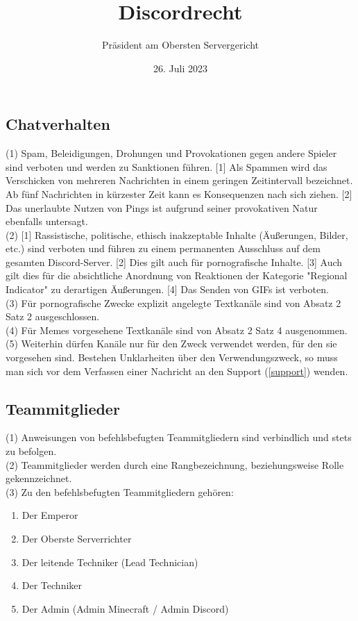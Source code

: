 \documentclass{article}
\title{Discordrecht}
\author{Präsident am Obersten Servergericht}
\date{26. Juli 2023}
\begin{document}
\maketitle
\newpage
\tableofcontents
\newpage
\subsection{Chatverhalten}\label{verhalten}
(1) Spam, Beleidigungen, Drohungen und Provokationen gegen andere Spieler sind verboten und werden zu Sanktionen führen. [1] Als Spammen wird das Verschicken von mehreren Nachrichten in einem geringen Zeitintervall bezeichnet. Ab fünf Nachrichten in kürzester Zeit kann es Konsequenzen nach sich ziehen. [2] Das unerlaubte Nutzen von Pings ist aufgrund seiner provokativen Natur ebenfalls untersagt.\\
(2) [1] Rassistische, politische, ethisch inakzeptable Inhalte (Äußerungen, Bilder, etc.) sind verboten und führen zu einem permanenten Ausschluss auf dem gesamten Discord-Server. [2] Dies gilt auch für pornografische Inhalte. [3] Auch gilt dies für die absichtliche Anordnung von Reaktionen der Kategorie "Regional Indicator" zu derartigen Äußerungen. [4] Das Senden von GIFs ist verboten.\\
(3) Für pornografische Zwecke explizit angelegte Textkanäle sind von Absatz 2 Satz 2 ausgeschlossen.\\
(4) Für Memes vorgesehene Textkanäle sind von Absatz 2 Satz 4 ausgenommen.\\
(5) Weiterhin dürfen Kanäle nur für den Zweck verwendet werden, für den sie vorgesehen sind. Bestehen Unklarheiten über den Verwendungszweck, so muss man sich vor dem Verfassen einer Nachricht an den Support (\ref{support}) wenden.

\subsection{Teammitglieder}\label{members}
(1) Anweisungen von befehlsbefugten Teammitgliedern sind verbindlich und stets zu befolgen.\\
(2) Teammitglieder werden durch eine Rangbezeichnung, beziehungsweise Rolle gekennzeichnet.\\
(3) Zu den befehlsbefugten Teammitgliedern gehören:
\begin{enumerate}
	\item Der Emperor
	\item Der Oberste Serverrichter
	\item Der leitende Techniker (Lead Technician)
	\item Der Techniker
	\item Der Admin (Admin Minecraft / Admin Discord)
\end{enumerate}
\end{document}
